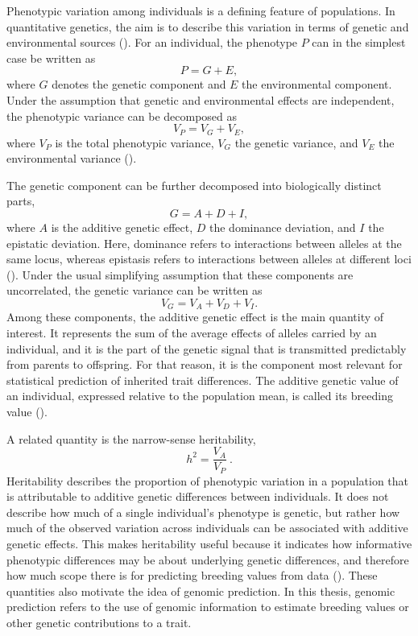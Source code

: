 Phenotypic variation among individuals is a defining feature of populations. In quantitative genetics, the aim is to describe this variation in terms of genetic and environmental sources (\cite{falconer_introduction_1989}). For an individual, the phenotype $P$ can in the simplest case be written as
\[
P = G + E,
\]
where $G$ denotes the genetic component and $E$ the environmental component. Under the assumption that genetic and environmental effects are independent, the phenotypic variance can be decomposed as
\[
V_P = V_G + V_E,
\]
where $V_P$ is the total phenotypic variance, $V_G$ the genetic variance, and $V_E$ the environmental variance (\cite{falconer_introduction_1989}).

The genetic component can be further decomposed into biologically distinct parts,
\[
G = A + D + I,
\]
where $A$ is the additive genetic effect, $D$ the dominance deviation, and $I$ the epistatic deviation. Here, dominance refers to interactions between alleles at the same locus, whereas epistasis refers to interactions between alleles at different loci (\cite{lynch_genetics_1998}). Under the usual simplifying assumption that these components are uncorrelated, the genetic variance can be written as
\[
V_G = V_A + V_D + V_I.
\]
Among these components, the additive genetic effect is the main quantity of interest. It represents the sum of the average effects of alleles carried by an individual, and it is the part of the genetic signal that is transmitted predictably from parents to offspring. For that reason, it is the component most relevant for statistical prediction of inherited trait differences. The additive genetic value of an individual, expressed relative to the population mean, is called its breeding value (\cite{wilson_ecologists_2010}).

A related quantity is the narrow-sense heritability,
\[
h^2 = \frac{V_A}{V_P} \ .
\]
Heritability describes the proportion of phenotypic variation in a population that is attributable to additive genetic differences between individuals. It does not describe how much of a single individual’s phenotype is genetic, but rather how much of the observed variation across individuals can be associated with additive genetic effects. This makes heritability useful because it indicates how informative phenotypic differences may be about underlying genetic differences, and therefore how much scope there is for predicting breeding values from data (\cite{visscher_five_2012}).
These quantities also motivate the idea of genomic prediction. In this thesis, genomic prediction refers to the use of genomic information to estimate breeding values or other genetic contributions to a trait. 

